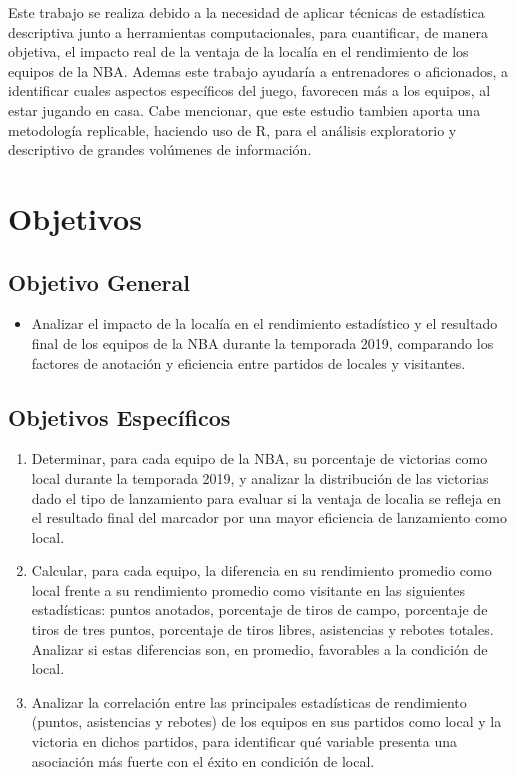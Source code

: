 \documentclass[oneside,11pt]{Latex/Classes/PhDthesisPSnPDF}
\begin{document}
Este trabajo se realiza debido a la necesidad de aplicar técnicas de
estadística descriptiva junto a herramientas computacionales, para
cuantificar, de manera objetiva, el impacto real de la ventaja de la
localía en el rendimiento de los equipos de la NBA. Ademas este trabajo
ayudaría a entrenadores o aficionados, a identificar cuales aspectos
específicos del juego, favorecen más a los equipos, al estar jugando en
casa. Cabe mencionar, que este estudio tambien aporta una metodología
replicable, haciendo uso de R, para el análisis exploratorio y
descriptivo de grandes volúmenes de información.

\section{Objetivos}

\subsection{Objetivo General}
\begin{itemize}
  \item{Analizar el impacto de la localía en el rendimiento estadístico y el resultado final de los equipos de la NBA durante la temporada 2019, comparando los factores de anotación y eficiencia entre partidos de locales y visitantes.}
\end{itemize}
\subsection{Objetivos Específicos}
\begin{enumerate}
  \item Determinar, para cada equipo de la NBA, su porcentaje de victorias como local durante la temporada 2019, y analizar la distribución de las victorias dado el tipo de lanzamiento para evaluar si la ventaja de localia se refleja en el resultado final del marcador por una mayor eficiencia de lanzamiento como local.
  \item Calcular, para cada equipo, la diferencia en su rendimiento promedio como local frente a su rendimiento promedio como visitante en las siguientes estadísticas: puntos anotados, porcentaje de tiros de campo, porcentaje de tiros de tres puntos, porcentaje de tiros libres, asistencias y rebotes totales. Analizar si estas diferencias son, en promedio, favorables a la condición de local.
  \item Analizar la correlación entre las principales estadísticas de rendimiento (puntos, asistencias y rebotes) de los equipos en sus partidos como local y la victoria en dichos partidos, para identificar qué variable presenta una asociación más fuerte con el éxito en condición de local.
\end{enumerate}
\end{document}

